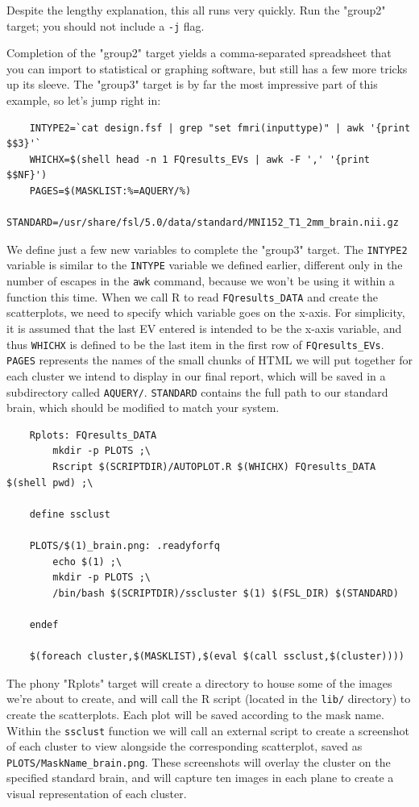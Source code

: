 Despite the lengthy explanation, this all runs very quickly. Run the "group2" target; you should not include a \texttt{-j} flag.

Completion of the "group2" target yields a comma-separated spreadsheet that you can import to statistical or graphing software, but \maken{} still has a few more tricks up its sleeve. The "group3" target is by far the most impressive part of this example, so let's jump right in:

\begin{lstlisting}
	INTYPE2=`cat design.fsf | grep "set fmri(inputtype)" | awk '{print $$3}'`
	WHICHX=$(shell head -n 1 FQresults_EVs | awk -F ',' '{print $$NF}')
	PAGES=$(MASKLIST:%=AQUERY/%)
	STANDARD=/usr/share/fsl/5.0/data/standard/MNI152_T1_2mm_brain.nii.gz
\end{lstlisting}

We define just a few new variables to complete the "group3" target. The \texttt{INTYPE2} variable is similar to the \texttt{INTYPE} variable we defined earlier, different only in the number of escapes in the \texttt{awk} command, because we won't be using it within a function this time. When we call R to read \texttt{FQresults_DATA} and create the scatterplots, we need to specify which variable goes on the x-axis. For simplicity, it is assumed that the last EV entered is intended to be the x-axis variable, and thus \texttt{WHICHX} is defined to be the last item in the first row of \texttt{FQresults_EVs}. \texttt{PAGES} represents the names of the small chunks of HTML we will put together for each cluster we intend to display in our final report, which will be saved in a subdirectory called \texttt{AQUERY/}. \texttt{STANDARD} contains the full path to our standard brain, which should be modified to match your system.

\begin{lstlisting}
	Rplots: FQresults_DATA
		mkdir -p PLOTS ;\
		Rscript $(SCRIPTDIR)/AUTOPLOT.R $(WHICHX) FQresults_DATA $(shell pwd) ;\	
	
	define ssclust
	
	PLOTS/$(1)_brain.png: .readyforfq
		echo $(1) ;\
		mkdir -p PLOTS ;\
		/bin/bash $(SCRIPTDIR)/sscluster $(1) $(FSL_DIR) $(STANDARD)
			
	endef
	
	$(foreach cluster,$(MASKLIST),$(eval $(call ssclust,$(cluster))))
\end{lstlisting}

The phony "Rplots" target will create a directory to house some of the images we're about to create, and will call the R script (located in the \texttt{lib/} directory) to create the scatterplots. Each plot will be saved according to the mask name.  Within the \texttt{ssclust} function we will call an external script to create a screenshot of each cluster to view alongside the corresponding scatterplot, saved as \texttt{PLOTS/MaskName_brain.png}. These screenshots will overlay the cluster on the specified standard brain, and will capture ten images in each plane to create a visual representation of each cluster.

